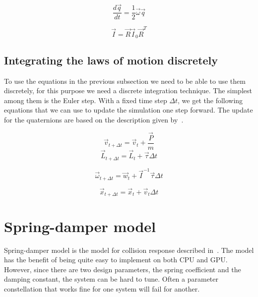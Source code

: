 \begin{equation}
  \frac{d\vec{q}}{dt} = \frac{1}{2}\vec{\omega}\vec{q}
\end{equation}

\begin{equation}
  \vec{I} = \vec{R}\vec{I}_0\vec{R}^T
\end{equation}

\subsection{Integrating the laws of motion discretely}
To use the equations in the previous subsection we need to be able to use them
discretely, for this purpose we need a discrete integration technique. The
simplest among them is the Euler step. With a fixed time step $\Delta t$, we
get the following equations that we can use to update the simulation one step
forward. The update for the quaternions are based on the description given by~\cite{fossum}.

\begin{equation}
  \vec{v}_{t + \Delta t} = \vec{v}_{t}+\frac{\vec{P}}{m}
\end{equation}
\begin{equation}
  \vec{L}_{t + \Delta t} = \vec{L}_{t}+\vec{\tau}\Delta t
\end{equation}

\begin{equation}
  \vec{\omega}_{t + \Delta t} = \vec{w}_t+\vec{I}^{-1}\vec{\tau}\Delta t
\end{equation}

\begin{equation}
  \vec{x}_{t + \Delta t} = \vec{x}_{t} + \vec{v}_t\Delta t
\end{equation}

\section{Spring-damper model}
Spring-damper model is the model for collision response described in~\cite{gpugems}.
The model has the benefit of being quite easy to implement on both CPU and GPU.
However, since there are two design parameters, the spring coefficient and the damping
constant, the system can be hard to tune. Often a parameter constellation that works
fine for one system will fail for another.

